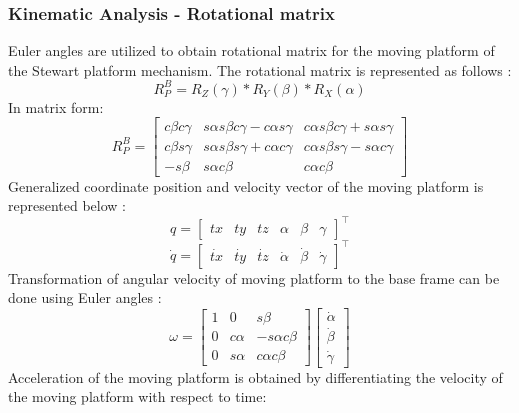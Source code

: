 \subsubsection{Kinematic Analysis - Rotational matrix}
Euler angles are utilized to obtain rotational matrix for the moving platform of the Stewart platform mechanism. The rotational matrix is represented as follows \cite{csumnu2017simulation}:
\begin{equation}
 R_{P}^B = R_{Z}(\gamma)*R_{Y}(\beta)*R_{X}(\alpha)
\end{equation}
In matrix form:
\[ R_{P}^B =
 \begin{bmatrix}
 c\beta c\gamma & s\alpha s\beta c\gamma - c\alpha s\gamma & c\alpha s\beta c\gamma + s\alpha s\gamma\\
 c\beta s\gamma & s\alpha s\beta s\gamma + c\alpha c\gamma & c\alpha s\beta s\gamma - s\alpha c\gamma\\
 -s\beta & s\alpha c\beta & c\alpha c\beta  
 \end{bmatrix}
\]
Generalized coordinate position and velocity vector of the moving platform is represented below \cite{csumnu2017simulation}:
\[
q=
\begin{bmatrix}
tx & ty & tz & \alpha & \beta & \gamma
\end{bmatrix}^\top
\]
\[
\dot{q}=
\begin{bmatrix}
\dot{tx} & \dot{ty} & \dot{tz} & \dot{\alpha} & \dot{\beta} & \dot{\gamma}
\end{bmatrix}^\top
\]
Transformation of angular velocity of moving platform to the base frame can be done using Euler angles \cite{csumnu2017simulation}:
\[
\omega =
\begin{bmatrix}
1 & 0 & s\beta \\
0 & c\alpha & -s\alpha c\beta \\
0 & s\alpha & c\alpha c\beta 
\end{bmatrix}
\begin{bmatrix}
\dot{\alpha} \\
\dot{\beta}\\
\dot{\gamma}
\end{bmatrix}
\]
Acceleration of the moving platform is obtained by differentiating the velocity of the moving platform with respect to time:
